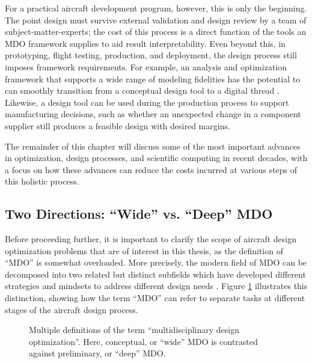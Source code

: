 For a practical aircraft development program, however, this is only the beginning. The point design must survive external validation and design review by a team of subject-matter-experts; the cost of this process is a direct function of the tools an MDO framework supplies to aid result interpretability. Even beyond this, in prototyping, flight testing, production, and deployment, the design process still imposes framework requirements. For example, an analysis and optimization framework that supports a wide range of modeling fidelities has the potential to can smoothly transition from a conceptual design tool to a digital thread \cite{niederer_scaling_2021, singh_engineering_2018}. Likewise, a design tool can be used during the production process to support manufacturing decisions, such as whether an unexpected change in a component supplier still produces a feasible design with desired margins.

The remainder of this chapter will discuss some of the most important advances in optimization, design processes, and scientific computing in recent decades, with a focus on how these advances can reduce the costs incurred at various steps of this holistic process.

\subsection{Two Directions: ``Wide'' vs. ``Deep'' MDO}
\label{sec:wide_vs_deep}

Before proceeding further, it is important to clarify the scope of aircraft design optimization problems that are of interest in this thesis, as the definition of ``MDO'' is somewhat overloaded. More precisely, the modern field of MDO can be decomposed into two related but distinct subfields which have developed different strategies and mindsets to address different design needs \cite{piperni_development_2013}. Figure \ref{fig:mdo_overloaded_term} illustrates this distinction, showing how the term ``MDO'' can refer to separate tasks at different stages of the aircraft design process.

\begin{figure}[htbp!]
    \centering
    \caption{Multiple definitions of the term ``multidisciplinary design optimization''. Here, conceptual, or ``wide'' MDO is contrasted against preliminary, or ``deep'' MDO.}
    \label{fig:mdo_overloaded_term}
\end{figure}

